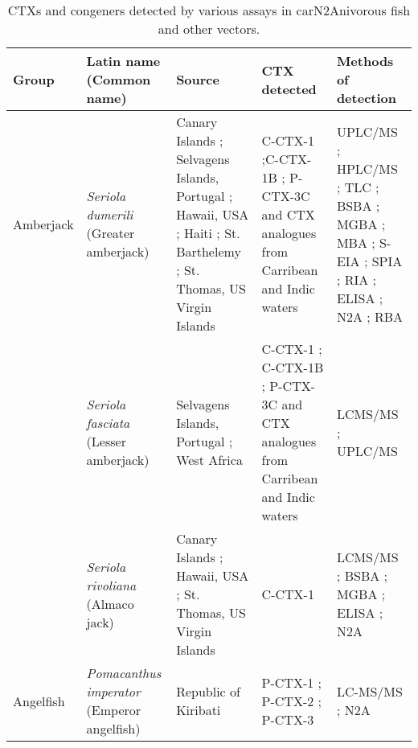 \documentclass[12pt]{article}
\begin{document}
	\begin{longtable}[l]{ | p{2cm} | p{3cm} | p{4.5cm} | p{2cm} | p{3cm} | }
	\caption{CTXs and congeners detected by various assays in carN2Anivorous fish and other vectors.}\\
	\hline
	\label{tbl:CarnTable}
	\textbf{Group} & \textbf{Latin name} (Common name) & \textbf{Source} & \textbf{CTX detected} & \textbf{Methods of detection} \\
	\hline
	Amberjack & \emph{Seriola dumerili} (Greater amberjack) & Canary Islands \cite{caillaud2012towards}; Selvagens Islands, Portugal \cite{otero2010first}; Hawaii, USA \cite{campora2008detection,hokama1977radioimmunoassay,hokama1983rapid,hokama1993evaluation}; Haiti \cite{poli1997identification}; St. Barthelemy \cite{vernoux1986heterogeneity}; St. Thomas, US Virgin Islands \cite{granade1976ciguatera} & C-CTX-1 \cite{poli1997identification};C-CTX-1B \cite{otero2010first}; P-CTX-3C and CTX analogues from Carribean and Indic waters \cite{otero2010first} & UPLC/MS \cite{otero2010first}; HPLC/MS \cite{poli1997identification}; TLC \cite{vernoux1986heterogeneity}; BSBA \cite{granade1976ciguatera}; MGBA \cite{campora2008detection,granade1976ciguatera}; MBA \cite{hokama1983rapid,hokama1993evaluation,vernoux1986heterogeneity}; S-EIA \cite{hokama1993evaluation}; SPIA \cite{otero2010first}; RIA \cite{campora2008detection,hokama1983rapid}; ELISA \cite{campora2008detection}; N2A \cite{caillaud2012towards,campora2008detection}; RBA \cite{poli1997identification} \\
	& \emph{Seriola fasciata} (Lesser amberjack) & Selvagens Islands, Portugal \cite{otero2010first}; West Africa \cite{boada2010ciguatera} & C-CTX-1 \cite{boada2010ciguatera}; C-CTX-1B \cite{otero2010first}; P-CTX-3C and CTX analogues from Carribean and Indic waters \cite{otero2010first} & LCMS/MS \cite{boada2010ciguatera}; UPLC/MS \cite{otero2010first}\\
	& \emph{Seriola rivoliana} (Almaco jack) & Canary Islands \cite{campora2010evaluating}; Hawaii, USA \cite{campora2008detection}; St. Thomas, US Virgin Islands \cite{granade1976ciguatera} & C-CTX-1 \cite{rivoliana1999ciguatera} & LCMS/MS \cite{rivoliana1999ciguatera}; BSBA \cite{granade1976ciguatera}; MGBA \cite{granade1976ciguatera}; ELISA \cite{campora2008detection,campora2010evaluating}; N2A \cite{campora2008detection,campora2010evaluating} \\ 
	\hline
	Angelfish  & \emph{Pomacanthus imperator} (Emperor angelfish) & Republic of Kiribati \cite{mak2013pacific} & P-CTX-1 \cite{mak2013pacific}; P-CTX-2 \cite{mak2013pacific}; P-CTX-3 \cite{mak2013pacific} & LC-MS/MS \cite{mak2013pacific}; N2A \cite{mak2013pacific} \\

\end{longtable}
\end{document}
